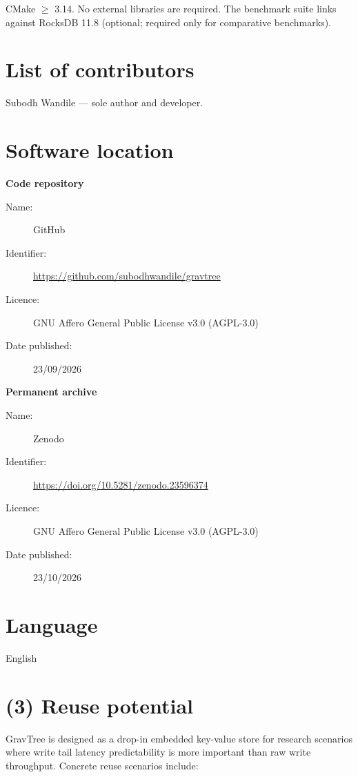 \documentclass{jors}
\begin{document}
CMake $\geq$ 3.14. No external libraries are required. The benchmark
suite links against RocksDB 11.8 (optional; required only for
comparative benchmarks).

\section*{List of contributors}

Subodh Wandile — sole author and developer.

\section*{Software location}

{\bf Code repository}
\begin{description}
  \item[Name:] GitHub
  \item[Identifier:] \url{https://github.com/subodhwandile/gravtree}
  \item[Licence:] GNU Affero General Public License v3.0 (AGPL-3.0)
  \item[Date published:] 23/09/2026
\end{description}

{\bf Permanent archive}
\begin{description}
  \item[Name:] Zenodo
  \item[Identifier:] \url{https://doi.org/10.5281/zenodo.23596374}
  \item[Licence:] GNU Affero General Public License v3.0 (AGPL-3.0)
  \item[Date published:] 23/10/2026
\end{description}

\section*{Language}

English

\section*{(3) Reuse potential}

GravTree is designed as a drop-in embedded key-value store for research
scenarios where write tail latency predictability is more important than
raw write throughput. Concrete reuse scenarios include:
\end{document}
